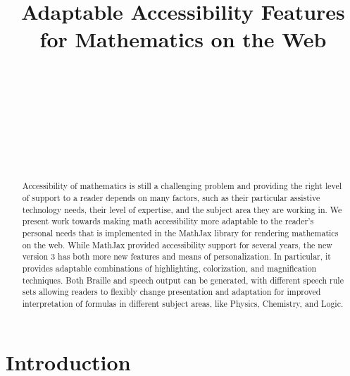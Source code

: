 \documentclass{sig-alternate}
\begin{document}


\title{Adaptable Accessibility Features for Mathematics on the Web}
  

\author{
  \\
  \\
  \\
  \\
  \\
  \\
  \\
}

\maketitle

\begin{abstract}
  Accessibility of mathematics is still a challenging problem and providing the
  right level of support to a reader depends on many factors, such as their
  particular assistive technology needs, their level of expertise, and the
  subject area they are working in. We present work towards making math
  accessibility more adaptable to the reader's personal needs that is
  implemented in the MathJax library for rendering mathematics on the web. While
  MathJax provided accessibility support for several years, the new version 3
  has both more new features and means of personalization. In particular, it
  provides adaptable combinations of highlighting, colorization, and
  magnification techniques. Both Braille and speech output can be generated,
  with different speech rule sets allowing readers to flexibly change
  presentation and adaptation for improved interpretation of formulas in
  different subject areas, like Physics, Chemistry, and Logic.
\end{abstract}



\section{Introduction}
\end{document}
